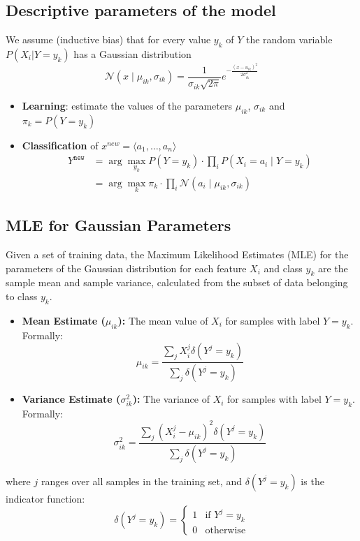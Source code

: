 \subsection{Descriptive parameters of the model}
We assume (inductive bias) that for every value $y_k$ of $Y$ the
random variable $P(X_i |Y = y_k )$ has a Gaussian distribution
\[
    \mathcal{N}(x\mid \mu_{ik}, \sigma_{ik}) = \frac{1}{\sigma_{ik}\sqrt{2\pi}}e^{-\frac{(x-u_{ik})^2}{2\sigma^2_{ik}}}
\]
\begin{itemize}
    \item \textbf{Learning}: estimate the values of the parameters $ \mu_{ik} $, $\sigma_{ik}$ and $\pi_k = P(Y = y_k )$
    \item \textbf{Classification} of $x^{new} = \langle a_1,\dots, a_n\rangle$
        \begin{align*}
            Y^{\texttt{new}} &= \arg \max_{y_k} P(Y= y_k ) \cdot \prod_{i} P(X_i = a_i \mid Y = y_k )\\
            &= \arg \max_{k}\pi_k\cdot \prod_{i}\mathcal{N}(a_i\mid \mu_{ik},\sigma_{ik})
        \end{align*}
\end{itemize}

\subsection{MLE for Gaussian Parameters}
Given a set of training data, the Maximum Likelihood Estimates (MLE) for the parameters of the Gaussian distribution for each feature $X_i$ and class $y_k$ are the sample mean and sample variance, calculated from the subset of data belonging to class $y_k$.
    
    \begin{itemize}
        \item \textbf{Mean Estimate ($\mu_{ik}$):} The mean value of $X_i$ for samples with label $Y=y_k$. Formally:
        \[
            \mu_{ik} = \frac{\sum_j X_i^j \delta(Y^j = y_k)}{\sum_j \delta(Y^j = y_k)}
        \]
        \item \textbf{Variance Estimate ($\sigma_{ik}^2$):} The variance of $X_i$ for samples with label $Y=y_k$. Formally:
        \[
            \sigma^2_{ik} = \frac{\sum_j (X_i^j - \mu_{ik})^2 \delta(Y^j = y_k)}{\sum_j \delta(Y^j = y_k)}
        \]
    \end{itemize}
    where $j$ ranges over all samples in the training set, and $\delta(Y^j = y_k)$ is the indicator function:
    \[
        \delta(Y^j = y_k) = \begin{cases} 
            1 & \text{if } Y^j = y_k \\ 
            0 & \text{otherwise} 
        \end{cases}
    \]

